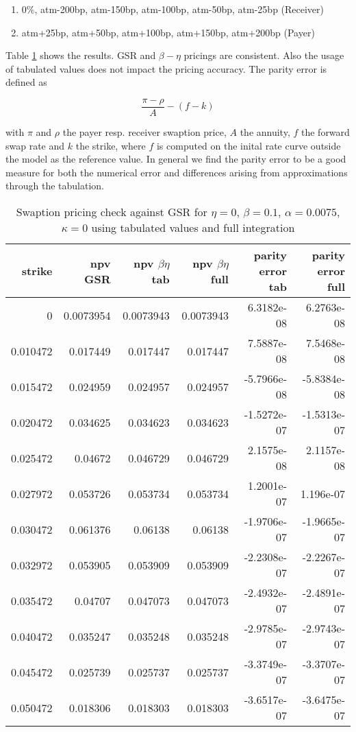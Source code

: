 \documentclass{amsart}
\theoremstyle{plain}
\numberwithin{equation}{section}
\begin{document}
\begin{enumerate}
\item 0\%, atm-200bp, atm-150bp, atm-100bp, atm-50bp, atm-25bp (Receiver)
\item atm+25bp, atm+50bp, atm+100bp, atm+150bp, atm+200bp (Payer)
\end{enumerate}

Table \ref{hwcase} shows the results. GSR and $\beta-\eta$ pricings are consistent. Also the usage of tabulated values does not impact the pricing accuracy. The parity error is defined as

\begin{equation}
\frac{\pi - \rho}{A} - (f-k)
\end{equation}

with $\pi$ and $\rho$ the payer resp. receiver swaption price, $A$ the annuity, $f$ the forward swap rate and $k$ the strike, where $f$ is computed on the inital rate curve outside the model as the reference value. In general we find the parity error to be a good measure for both the numerical error and differences arising from approximations through the tabulation.

\begin{table}[ht]
\caption{Swaption pricing check against GSR for $\eta=0$, $\beta=0.1$, $\alpha=0.0075$, $\kappa=0$ using tabulated values and full integration}
\begin{tabular}{r | r | r | r | r | r}
strike & npv GSR & npv $\beta\eta$ tab & npv $\beta\eta$ full & parity error tab & parity error full \\ \hline
0 & 0.0073954 & 0.0073943 & 0.0073943 & 6.3182e-08 & 6.2763e-08 \\ \hline
0.010472 & 0.017449 & 0.017447 & 0.017447 & 7.5887e-08 & 7.5468e-08 \\ 
0.015472 & 0.024959 & 0.024957 & 0.024957 & -5.7966e-08 & -5.8384e-08 \\
0.020472 & 0.034625 & 0.034623 & 0.034623 & -1.5272e-07 & -1.5313e-07 \\
0.025472 & 0.04672 & 0.046729 & 0.046729 & 2.1575e-08 & 2.1157e-08 \\
0.027972 & 0.053726 & 0.053734 & 0.053734 & 1.2001e-07 & 1.196e-07 \\ \hline
0.030472 & 0.061376 & 0.06138 & 0.06138 & -1.9706e-07 & -1.9665e-07 \\ \hline
0.032972 & 0.053905 & 0.053909 & 0.053909 & -2.2308e-07 & -2.2267e-07 \\
0.035472 & 0.04707 & 0.047073 & 0.047073 & -2.4932e-07 & -2.4891e-07 \\
0.040472 & 0.035247 & 0.035248 & 0.035248 & -2.9785e-07 & -2.9743e-07 \\
0.045472 & 0.025739 & 0.025737 & 0.025737 & -3.3749e-07 & -3.3707e-07 \\
0.050472 & 0.018306 & 0.018303 & 0.018303 & -3.6517e-07 & -3.6475e-07
\end{tabular}
\label{hwcase}
\end{table}
\end{document}
